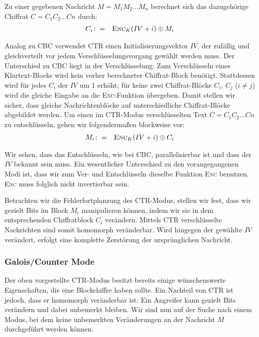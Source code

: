 \noindent Zu einer gegebenen Nachricht \(M = M_1M_2...M_n\) berechnet sich das dazugehörige Chiffrat \(C = C_1C_2...Cn\) durch:
\begin{eqnarray*}
	C_i	& \colon=	& \textsc{Enc}_{K}(IV + i) \oplus M_i
\end{eqnarray*}

Analog zu CBC verwendet CTR einen Initialisierungsvektor \(IV\), der zufällig und gleichverteilt vor jedem Verschlüsselungsvorgang gewählt werden muss. Der Unterschied zu CBC liegt in der Verschlüsselung: Zum Verschlüsseln eines Klartext-Blocks wird kein vorher berechneter Chiffrat-Block benötigt. Stattdessen wird für jedes \(C_i\) der \(IV\) um 1 erhöht; für keine zwei Chiffrat-Blöcke \(C_i\), \(C_j\) (\(i \neq j\)) wird die gleiche Eingabe an die \textsc{Enc}-Funktion übergeben. Damit stellen wir sicher, dass gleiche Nachrichtenblöcke auf unterschiedliche Chiffrat-Blöcke abgebildet werden. Um einen im CTR-Modus verschlüsselten Text \(C = C_1C_2...Cn\) zu entschlüsseln, gehen wir folgendermaßen blockweise vor:
\begin{eqnarray*}
	M_i	& \colon=	& \textsc{Enc}_{K}(IV + i) \oplus C_i
\end{eqnarray*}

Wir sehen, dass das Entschlüsseln, wie bei CBC, parallelisierbar ist und dass der \(IV\) bekannt sein muss. Ein wesentlicher Unterschied zu den vorangegangenen Modi ist, dass wir zum Ver- und Entschlüsseln dieselbe Funktion \textsc{Enc} benutzen. \textsc{Enc} muss folglich nicht invertierbar sein.

Betrachten wir die Fehlerfortplanzung des CTR-Modus, stellen wir fest, dass wir gezielt Bits im Block \(M_i\) manipulieren können, indem wir sie in dem entsprechenden Chiffratblock \(C_i\) verändern. Mittels CTR verschlüsselte Nachrichten sind somit homomorph veränderbar. Wird hingegen der gewählte \(IV\) verändert, erfolgt eine komplette Zerstörung der ursprünglichen Nachricht. 

\subsubsection{Galois/Counter Mode}

Der oben vorgestellte CTR-Modus besitzt bereits einige wünschenswerte Eigenschaften, die eine Blockchiffre haben sollte. Ein Nachteil von CTR ist jedoch, dass er homomorph veränderbar ist: Ein Angreifer kann gezielt Bits verändern und dabei unbemerkt bleiben. Wir sind nun auf der Suche nach einem Modus, bei dem keine unbemerkten Veränderungen an der Nachricht \(M\) durchgeführt werden können.

